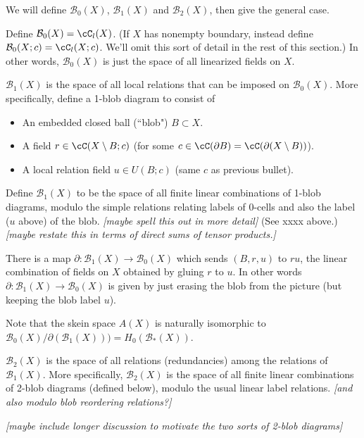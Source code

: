 \documentclass[11pt,leqno]{amsart}
\def\bc{{\mathcal B}}
\def\bd{\partial}
\def\sub{\subset}
\def\setmin{\setminus}
\def\nn#1{{{\it \small [#1]}}}
\begin{document}
We will define $\bc_0(X)$, $\bc_1(X)$ and $\bc_2(X)$, then give the general case.

Define $\bc_0(X) = \cC_l(X)$.
(If $X$ has nonempty boundary, instead define $\bc_0(X; c) = \cC_l(X; c)$.
We'll omit this sort of detail in the rest of this section.)
In other words, $\bc_0(X)$ is just the space of all linearized fields on $X$.

$\bc_1(X)$ is the space of all local relations that can be imposed on $\bc_0(X)$.
More specifically, define a 1-blob diagram to consist of
\begin{itemize}
\item An embedded closed ball (``blob") $B \sub X$.
\item A field $r \in \cC(X \setmin B; c)$
(for some $c \in \cC(\bd B) = \cC(\bd(X \setmin B))$).
\item A local relation field $u \in U(B; c)$
(same $c$ as previous bullet).
\end{itemize}
Define $\bc_1(X)$ to be the space of all finite linear combinations of
1-blob diagrams, modulo the simple relations relating labels of 0-cells and
also the label ($u$ above) of the blob.
\nn{maybe spell this out in more detail}
(See xxxx above.)
\nn{maybe restate this in terms of direct sums of tensor products.}

There is a map $\bd : \bc_1(X) \to \bc_0(X)$ which sends $(B, r, u)$ to $ru$, the linear
combination of fields on $X$ obtained by gluing $r$ to $u$.
In other words $\bd : \bc_1(X) \to \bc_0(X)$ is given by
just erasing the blob from the picture
(but keeping the blob label $u$).

Note that the skein space $A(X)$
is naturally isomorphic to $\bc_0(X)/\bd(\bc_1(X))) = H_0(\bc_*(X))$.

$\bc_2(X)$ is the space of all relations (redundancies) among the relations of $\bc_1(X)$.
More specifically, $\bc_2(X)$ is the space of all finite linear combinations of
2-blob diagrams (defined below), modulo the usual linear label relations.
\nn{and also modulo blob reordering relations?}

\nn{maybe include longer discussion to motivate the two sorts of 2-blob diagrams}
\end{document}

